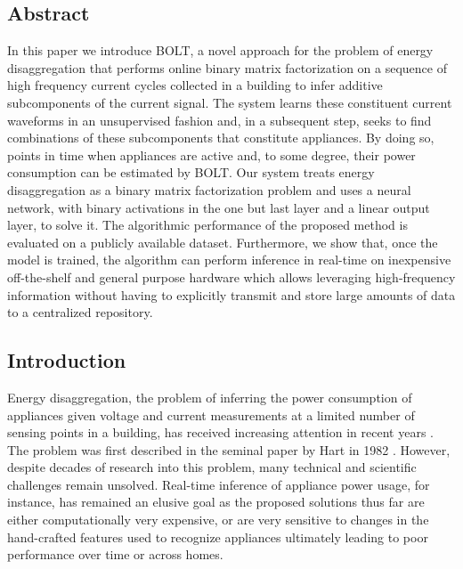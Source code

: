 
\newcommand{\ourname}{BOLT}

\subsection{Abstract}
In this paper we introduce \ourname, a novel approach for the problem of energy disaggregation that performs online binary matrix factorization on a sequence of high frequency current cycles collected in a building to infer additive subcomponents of the current signal. The system learns these constituent current waveforms in an unsupervised fashion and, in a subsequent step, seeks to find combinations of these subcomponents that constitute appliances. By doing so, points in time when appliances are active and, to some degree, their power consumption can be estimated by \ourname. Our system treats energy disaggregation as a binary matrix factorization problem and uses a neural network, with binary activations in the one but last layer and a linear output layer, to solve it. The algorithmic performance of the proposed method is evaluated on a publicly available dataset. Furthermore, we show that, once the model is trained, the algorithm can perform inference in real-time on inexpensive off-the-shelf and general purpose hardware which allows leveraging high-frequency information without having to explicitly transmit and store large amounts of data to a centralized repository.



%
%


\subsection{Introduction}

Energy disaggregation, the problem of inferring the power consumption of appliances given voltage and current measurements at a limited number of sensing points in a building, has received increasing attention in recent years \cite{zeifman2011nonintrusive, zoha2012non}. The problem was first described in the seminal paper by Hart in 1982 \cite{hart1992}. However, despite decades of research into this problem, many technical and scientific challenges remain unsolved. Real-time inference of appliance power usage, for instance, has remained an elusive goal as the proposed solutions thus far are either computationally very expensive, or are very sensitive to changes in the hand-crafted features used to recognize appliances ultimately leading to poor performance over time or across homes. 


